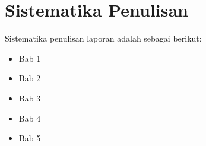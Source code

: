 \section{Sistematika Penulisan}
Sistematika penulisan laporan adalah sebagai berikut:
\begin{itemize}
	\item Bab 1 \babSatu \\
	\item Bab 2 \babDua \\
	\item Bab 3 \babTiga \\
	\item Bab 4 \babEmpat \\
	\item Bab 5 \kesimpulan \\
\end{itemize}


